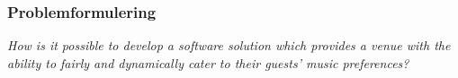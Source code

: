 \begin{frame}
	\frametitle{Problemformulering}
	\textit{How is it possible to develop a software solution which provides a venue with the
ability to fairly and dynamically cater to their guests’ music preferences?}

\end{frame}